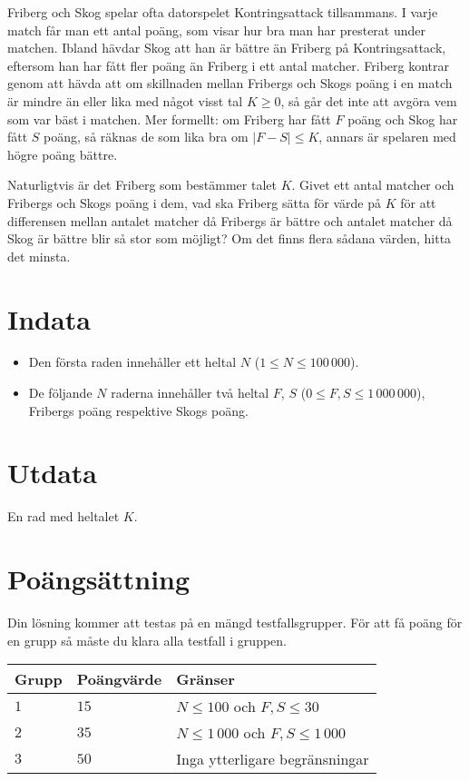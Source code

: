
Friberg och Skog spelar ofta datorspelet Kontringsattack tillsammans. I varje match får man ett antal poäng, som visar hur bra man har presterat under matchen. Ibland hävdar Skog att han är bättre än Friberg på Kontringsattack, eftersom han har fått fler poäng än Friberg i ett antal matcher. Friberg kontrar genom att hävda att om skillnaden mellan Fribergs och Skogs poäng i en match är mindre än eller lika med något visst tal $K\ge 0$, så går det inte att avgöra vem som var bäst i matchen. Mer formellt: om Friberg har fått $F$ poäng och Skog har fått $S$ poäng, så räknas de som lika bra om $|F - S| \le K$, annars är spelaren med högre poäng bättre.

Naturligtvis är det Friberg som bestämmer talet $K$. Givet ett antal matcher och Fribergs och Skogs poäng i dem, vad ska Friberg sätta för värde på $K$ för att differensen mellan antalet matcher då Fribergs är bättre och antalet matcher då Skog är bättre blir så stor som möjligt? Om det finns flera sådana värden, hitta det minsta.

\section*{Indata}
\begin{itemize}
  \item Den första raden innehåller ett heltal $N$ ($1 \le N \le 100\,000$).

  \item De följande $N$ raderna innehåller två heltal $F$, $S$ ($0 \le F, S \le 1\,000\,000$), Fribergs poäng respektive Skogs poäng.

\end{itemize}

\section*{Utdata}
En rad med heltalet $K$.

\section*{Poängsättning}
Din lösning kommer att testas på en mängd testfallsgrupper.
För att få poäng för en grupp så måste du klara alla testfall i gruppen.


\noindent
\begin{tabular}{| l | l | l |}
  \hline
  Grupp & Poängvärde & Gränser \\ \hline
  $1$    & $15$      & $N \le 100$ och $F,S\le 30$ \\ \hline
  $2$    & $35$      & $N \le 1\,000$ och $F,S\le 1\,000$\\ \hline
  $3$    & $50$      & Inga ytterligare begränsningar \\ \hline
\end{tabular}
